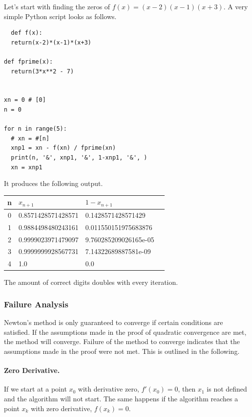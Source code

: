 Let's start with finding the zeros of $f(x) = (x-2)(x-1)(x+3)$. A very simple Python script looks as follows.

\begin{verbatim}
  def f(x):
  return(x-2)*(x-1)*(x+3)

def fprime(x):
  return(3*x**2 - 7)


xn = 0 # [0]
n = 0

for n in range(5):
  # xn = #[n]
  xnp1 = xn - f(xn) / fprime(xn)
  print(n, '&', xnp1, '&', 1-xnp1, '&', )
  xn = xnp1
\end{verbatim}

It produces the following output.

\vspace*{3mm}

\begin{tabular}{c|lll} \hline
  n & $x_{n+1}$ &  $1 - x_{n+1}$ \\ \hline
  0 & 0.8571428571428571 & 0.1428571428571429 \\
  1 & 0.9884498480243161 & 0.011550151975683876 \\
  2 & 0.9999023971479097 & 9.760285209026165e-05 \\
  3 & 0.9999999928567731 & 7.14322689887581e-09 \\
  4 & 1.0 & 0.0
\end{tabular}

\vspace*{3mm}

The amount of correct digits doubles with every iteration.

\subsubsection{Failure Analysis}

Newton's method is only guaranteed to converge if certain conditions are satisfied. If the assumptions made in the proof of quadratic convergence are met, the method will converge. Failure of the method to converge indicates that the assumptions made in the proof were not met. This is outlined in the following.

\paragraph{Zero Derivative.} If we start at a point $x_0$ with derivative zero, $f'(x_0) = 0$, then $x_1$ is not defined and the algorithm will not start. The same happens if the algorithm reaches a point $x_k$ with zero derivative, $f(x_k) = 0$.

